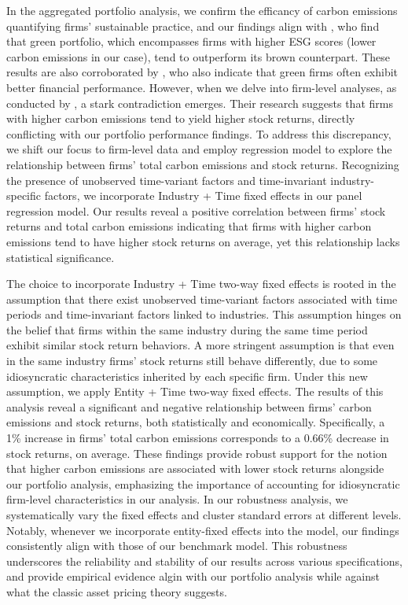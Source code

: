 \documentclass[12pt]{article}
\begin{document}
In the aggregated portfolio analysis, we confirm the efficancy of carbon emissions quantifying firms' sustainable practice, and our findings align with \cite{pastor2022dissecting}, who find that green portfolio, which encompasses firms with higher ESG scores (lower carbon emissions in our case), tend to outperform its brown counterpart. These results are also corroborated by \cite{friede2015esg}, who also indicate that green firms often exhibit better financial performance. However, when we delve into firm-level analyses, as conducted by \cite{bolton2021investors}, a stark contradiction emerges. Their research suggests that firms with higher carbon emissions tend to yield higher stock returns, directly conflicting with our portfolio performance findings. To address this discrepancy, we shift our focus to firm-level data and employ regression model to explore the relationship between firms' total carbon emissions and stock returns. Recognizing the presence of unobserved time-variant factors and time-invariant industry-specific factors, we incorporate Industry + Time fixed effects in our panel regression model. Our results reveal a positive correlation between firms' stock returns and total carbon emissions indicating that firms with higher carbon emissions tend to have higher stock returns on average, yet this relationship lacks statistical significance. 

The choice to incorporate Industry + Time two-way fixed effects is rooted in the assumption that there exist unobserved time-variant factors associated with time periods and time-invariant factors linked to industries. This assumption hinges on the belief that firms within the same industry during the same time period exhibit similar stock return behaviors. A more stringent assumption is that even in the same industry firms' stock returns still behave differently, due to some idiosyncratic characteristics inherited by each specific firm. Under this new assumption, we apply Entity + Time two-way fixed effects. The results of this analysis reveal a significant and negative relationship between firms' carbon emissions and stock returns, both statistically and economically. Specifically, a 1\% increase in firms' total carbon emissions corresponds to a 0.66\% decrease in stock returns, on average. These findings provide robust support for the notion that higher carbon emissions are associated with lower stock returns alongside our portfolio analysis, emphasizing the importance of accounting for idiosyncratic firm-level characteristics in our analysis. In our robustness analysis, we systematically vary the fixed effects and cluster standard errors at different levels. Notably, whenever we incorporate entity-fixed effects into the model, our findings consistently align with those of our benchmark model. This robustness underscores the reliability and stability of our results across various specifications, and provide empirical evidence algin with our portfolio analysis while against what the classic asset pricing theory suggests.
\end{document}
